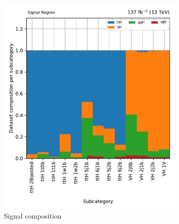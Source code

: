 \begin{figure}[htbp]
    \centering
    \begin{subfigure}[b]{0.4\textwidth}
        \includegraphics[width=\textwidth]{figures/region_plots/full_Run2/region_0/signal_composition.pdf}
        \caption{Signal composition}
    \end{subfigure}
    \hspace{0.05\textwidth}
    \begin{subfigure}[b]{0.4\textwidth}

\end{subfigure}
\end{figure}
